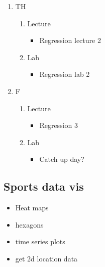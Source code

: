 \documentclass{article}
\begin{document}
\begin{enumerate}
\item TH
\label{sec:org7986162}
\begin{enumerate}
\item Lecture
\label{sec:orgabaeb2a}
\begin{itemize}
\item Regression lecture 2
\end{itemize}
\item Lab
\label{sec:org2c6f570}
\begin{itemize}
\item Regression lab 2
\end{itemize}
\end{enumerate}
\item F
\label{sec:org747d446}
\begin{enumerate}
\item Lecture
\label{sec:orgc159e40}
\begin{itemize}
\item Regression 3
\end{itemize}
\item Lab
\label{sec:orgfd18447}
\begin{itemize}
\item Catch up day?
\end{itemize}
\end{enumerate}
\end{enumerate}
\subsection{Sports data vis}
\label{sec:orgaccbc28}
\begin{itemize}
\item Heat maps
\item hexagons
\item time series plots
\item get 2d location data
\end{itemize}
\end{document}
